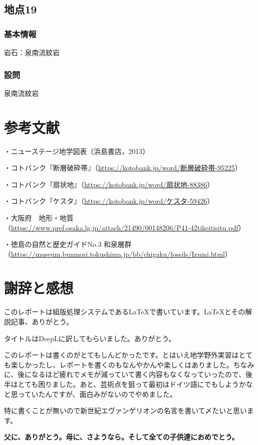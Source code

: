 \documentclass[uplatex,b5paper]{jsreport}
\begin{document}
  \clearpage

  \section{地点19}
    \subsection{基本情報}
    岩石：泉南流紋岩
    \subsection{設問}
    泉南流紋岩
  \clearpage

  \chapter*{参考文献}
  \begin{flushleft}
    ・ニューステージ地学図表（浜島書店，2013）\par
    ・コトバンク『断層破砕帯』（\url{https://kotobank.jp/word/断層破砕帯-95225}）\par
    ・コトバンク『扇状地』（\url{https://kotobank.jp/word/扇状地-88386}）\par
    ・コトバンク『ケスタ』（\url{https://kotobank.jp/word/ケスタ-59426}）\par
    ・大阪府　地形・地質（\url{https://www.pref.osaka.lg.jp/attach/21490/00148206/P41-42tikeitisitu.pdf}）\par
    ・徳島の自然と歴史ガイドNo.3 和泉層群（\url{https://museum.bunmori.tokushima.jp/bb/chigaku/fossils/Izumi.html}）\par
  \end{flushleft}

  
  \chapter*{謝辞と感想}
  このレポートは組版処理システムである\LaTeX で書いています。\LaTeX とその解説記事、ありがとう。\par
  タイトルはDeepLに訳してもらいました。ありがとう。\par

  このレポートは書くのがとてもしんどかったです。とはいえ地学野外実習はとても楽しかったし、レポートを書くのもなんやかんや楽しくはありました。ちなみに、後になるほど疲れでメモが減っていて書く内容もなくなっていったので、後半はとても困りました。あと、芸術点を狙って最初はドイツ語にでもしようかなと思っていたんですが、面白みがないのでやめました。

  特に書くことが無いので新世紀エヴァンゲリオンの名言を書いて〆たいと思います。\\

  \centerline{\textbf{父に、ありがとう。母に、さようなら。そして全ての子供達におめでとう。}}\par
\end{document}
